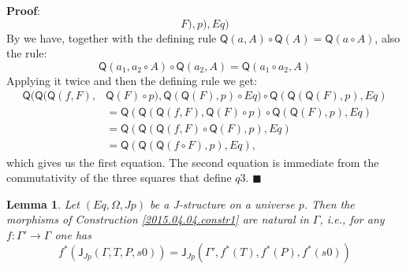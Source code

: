 \documentclass[12pt]{article}
\numberwithin{equation}{section}
\newenvironment{eq}{\begin{equation}}{\end{equation}}
\newenvironment{myproof}{{\bf Proof}:}{$\blacksquare$ \vskip 5mm }
\newtheorem{lemma}[proposition]{Lemma}
\newcommand{\sr}{\rightarrow}
\newcommand{\J}{\mathsf{J}}
\newcommand{\Q}{\mathsf{Q}}
\begin{document}
\begin{myproof}
$$F),p),Eq)$$
%
By \cite[Lemma 3.2]{fromunivwithPi} we have, together with the defining rule
$\Q(a,A)\circ \Q(A)=\Q(a\circ A)$, also the rule:
%
$$\Q(a_1,a_2\circ A)\circ \Q(a_2,A)=\Q(a_1\circ a_2, A)$$
%
Applying it twice and then the defining rule we get:
%
\begin{align*}
  \Q(\Q(\Q(f,F),&\Q(F)\circ p),\Q(\Q(F),p)\circ Eq)\circ \Q(\Q(\Q(F),p),Eq) \\
    & = \Q(\Q(\Q(f,F),\Q(F)\circ p)\circ \Q(\Q(F),p), Eq) \\
    & = \Q(\Q(\Q(f,F)\circ \Q(F),p),Eq) \\
    & = \Q(\Q(\Q(f\circ F),p),Eq),
\end{align*}
%
which gives us the first equation. The second equation is immediate from the
commutativity of the three squares that define $q3$.
\end{myproof}
%
\begin{lemma}
\label{2015.04.04.l1} Let $(Eq,\Omega,Jp)$ be a J-structure on a universe
$p$. Then the morphisms of Construction \ref{2015.04.04.constr1} are natural in
$\Gamma$, i.e., for any $f:\Gamma'\sr \Gamma$ one has
%
\begin{eq}\label{2015.04.04.eq3}
f^*(\J_{Jp}(\Gamma,T,P,s0))=\J_{Jp}(\Gamma',f^*(T),f^*(P),f^*(s0))
\end{eq}%
%
\end{lemma}
%
\end{document}
